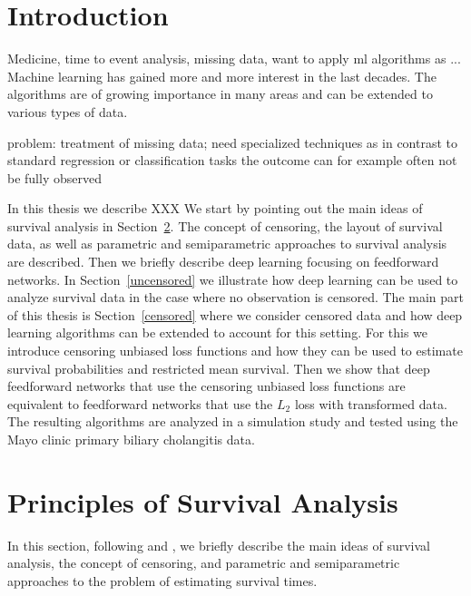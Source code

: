 \documentclass[12pt, a4paper]{scrartcl}
\theoremstyle{definition}
\theoremstyle{plain}
\numberwithin{equation}{section}
\numberwithin{figure}{section}
\numberwithin{table}{section}
\begin{document}
	
	\thispagestyle{plain}
	\tableofcontents
	\newpage

	
	\section{Introduction} \label{introduction}
	
	Medicine, time to event analysis, missing data, want to apply ml algorithms as ...
	Machine learning has gained more and more interest in the last decades.
	The algorithms are of growing importance in many areas and can be extended to various types of data.
	
	problem: treatment of missing data;
	need specialized techniques as in contrast to standard regression or classification tasks the outcome can for example often not be fully observed
	
	In this thesis we describe XXX
	We start by pointing out the main ideas of survival analysis in Section~\ref{sec:sa}.
	The concept of censoring, the layout of survival data, as well as parametric and semiparametric approaches to survival analysis are described.
	Then we briefly describe deep learning focusing on feedforward networks.
	In Section~\ref{uncensored} we illustrate how deep learning can be used to analyze survival data in the case where no observation is censored.
	The main part of this thesis is Section~\ref{censored} where we consider censored data and how deep learning algorithms can be extended to account for this setting.
	For this we introduce censoring unbiased loss functions and how they can be used to estimate survival probabilities and restricted mean survival.
	Then we show that deep feedforward networks that use the censoring unbiased loss functions are equivalent to feedforward networks that use the $L_2$ loss with transformed data.
	The resulting algorithms are analyzed in a simulation study and tested using the Mayo clinic primary biliary cholangitis data. 
	\newpage
	
	\section{Principles of Survival Analysis}\label{sec:sa}
		
	In this section, following \citet*{sabook} and \citet*{mathsabook}, we briefly describe the main ideas of survival analysis, the concept of censoring, and parametric and semiparametric approaches to the problem of estimating survival times.
	
\end{document}
